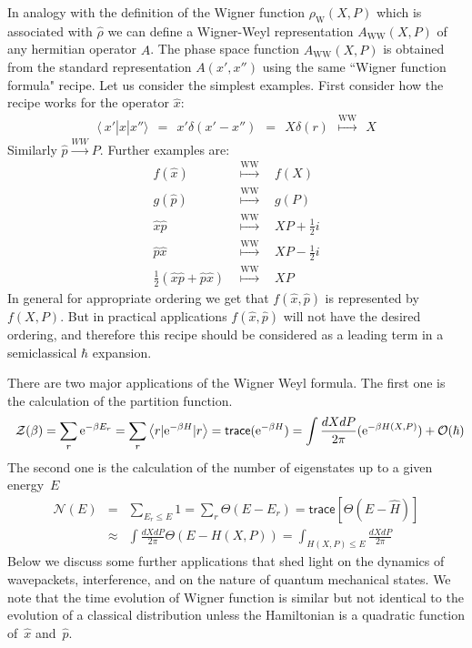 \documentclass[onecolumn,fleqn]{revtex4}
\newcommand{\trc}{\mathsf{trace}}
\newcommand{\eexp}{\mathrm{e}^}
\newcommand{\tbox}[1]{\text{#1}}
\newcommand{\beq}{\begin{eqnarray}}
\newcommand{\eeq}{\end{eqnarray}}
\begin{document}
In analogy with the definition of the Wigner function $\rho_{\tbox{W}}(X,P)$ 
which is associated with $\hat{\rho}$ we can define a Wigner-Weyl 
representation $A_{\tbox{WW}}(X,P)$  of any hermitian operator $\hat{A}$.  
The phase space function $A_{\tbox{WW}}(X,P)$ is obtained from 
the standard representation ${A(x',x'')}$ 
using the same ``Wigner function formula" recipe.  
Let us consider the simplest examples.    
First consider how the recipe works for the operator $\hat{x}$:   
\beq
\langle \ x'|\hat{x} |x'' \rangle
\ \ = \ \ 
x'\delta(x'-x'')
\ \ = \ \ X\delta(r)
\ \ \stackrel{\tbox{WW}}{\longmapsto} \ \ X
\eeq
Similarly $\hat{p}\stackrel{WW}{\rightarrow}P$.
Further examples are: 
\beq
f(\hat{x})
& \ \ \stackrel{\tbox{WW}}{\longmapsto} \ \  
& f(X)
\\ 
g(\hat{p})
& \ \ \stackrel{\tbox{WW}}{\longmapsto} \ \  
& g(P)
\\ 
\hat{x}\hat{p} 
& \ \ \stackrel{\tbox{WW}}{\longmapsto} \ \  
& XP +\frac{1}{2}i 
\\ 
 \hat{p}\hat{x} 
& \ \ \stackrel{\tbox{WW}}{\longmapsto} \ \ 
& XP -\frac{1}{2}i 
\\ 
\frac{1}{2}(\hat{x}\hat{p}+\hat{p}\hat{x}) 
& \ \ \stackrel{\tbox{WW}}{\longmapsto} \ \ 
& XP 
\eeq
In general for appropriate ordering we get that $f(\hat{x},\hat{p})$ 
is represented by $f(X,P)$. But in practical applications $f(\hat{x},\hat{p})$  
will not have the desired ordering, and therefore this recipe 
should be considered as a leading term in a semiclassical $\hbar$ expansion. 

There are two major applications of the Wigner Weyl formula. 
The first one is the calculation of the partition function.
\beq
\hspace{2 mm} \mathcal{Z}(\beta)
=\sum_{r}  \eexp{-\beta E_{r}}
= \sum_{r}  \left\langle r | \eexp{-\beta H} |r \right\rangle
=\trc(\eexp{-\beta H})
= \int\frac{dXdP}{2\pi}(\eexp{-\beta H(X,P)}) + \mathcal{O}(\hbar)
\eeq
The second one is the calculation of the number of eigenstates 
up to a given energy~$E$
\beq
\mathcal{N}(E)
&=& \sum_{E_r\leq E}1
=\sum_{r}\Theta(E-E_{r})
=\trc[\Theta(E-\hat{H})]
\\ \nonumber
& \approx & \int\frac{dXdP}
{2\pi}\Theta(E-H(X,P)) 
=\int_{{H(X,P)\leq E}}\frac{dXdP}{2\pi}
\eeq
Below we discuss some further applications
that shed light on the dynamics of 
wavepackets, interference, and on the nature 
of quantum mechanical states. We note that 
the time evolution of Wigner function is 
similar but not identical to the evolution 
of a classical distribution unless the 
Hamiltonian is a quadratic function 
of~$\hat{x}$ and~$\hat{p}$. 
 
\end{document}
